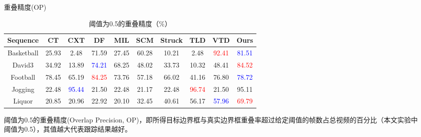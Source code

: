 \begin{frame}{重叠精度(OP)}

\begin{table}[!t]
\centering
\renewcommand{\arraystretch}{1.5}
\caption{阈值为0.5的重叠精度（\%）}

\begin{adjustbox}{max width=\textwidth}
\begin{tabular}{|c|c|c|c|c|c|c|c|c|c|}
\hline Sequence & CT & CXT & DF & MIL & SCM & Struck & TLD & VTD & Ours\\
\hline Basketball & 25.93  & 2.48 & 71.59 & 27.45 & 60.28 & 10.21 & 2.48 & \textcolor{red}{92.41}  & \textcolor{blue}{81.51} \\
\hline David3     & 34.92  & 13.89 & \textcolor{blue}{74.21} & 68.25 & 48.02 & 33.73 & 10.32 & 48.41 & \textcolor{red}{84.52} \\
\hline Football   & 78.45 & 65.19  & \textcolor{red}{84.25}  & 73.76 & 57.18 & 66.02  & 41.16  & 76.80 & \textcolor{blue}{78.72} \\
\hline Jogging    & 22.48  & \textcolor{blue}{95.44}   & 21.50 & 22.48 & 21.17& 22.48  & \textcolor{red}{96.74}   & 21.50 &  {95.11}\\
\hline Liquor     & 20.85 & 20.96 & 22.92& 20.10& 32.45 & 40.61  & 56.17 & \textcolor{blue}{57.96} & \textcolor{red}{69.79} \\
\hline
\end{tabular}
\end{adjustbox}
\label{tab:LR_OP}
\end{table}

阈值为0.5的重叠精度(Overlap Precision, OP)，即所得目标边界框与真实边界框重叠率超过给定阈值的帧数占总视频的百分比（本文实验中阈值为0.5），其值越大代表跟踪结果越好。
\end{frame}


